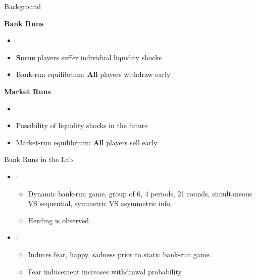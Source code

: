 \documentclass{beamer}
\begin{document}
\begin{frame}{Background}

\textbf{Bank Runs}

\vspace{0.1in}

\begin{itemize}
    \item \cite{diamond1983bank}
    \item \textbf{Some} players suffer individual liquidity shocks
    \item Bank-run equilibrium: \textbf{All} players withdraw early
\end{itemize}

\vspace{0.2in}

\textbf{Market Runs}

\vspace{0.1in}

\begin{itemize}
    \item \cite{bernardo2004liquidity}
    \item Possibility of liquidity shocks in the future
    \item Market-run equilibrium: \textbf{All}  players sell early
\end{itemize}

\end{frame}


\begin{frame}{Bank Runs in the Lab}
\begin{itemize}
    \item \cite{schotter2009dynamics}:     
    \begin{itemize}
        \item Dynamic bank-run game, group of 6, 4 periods, 21 rounds, simultaneous VS sequential, symmetric VS asymmetric info.
        \item Herding is observed.
        \end{itemize}
    \vspace{0.2in}
    \item \cite{dijk2017bank}: 
    \begin{itemize}
        \item Induces fear, happy, sadness prior to static bank-run game. 
        \item Fear inducement increases withdrawal probability
    \end{itemize}
\end{itemize}
\end{frame}
\end{document}
